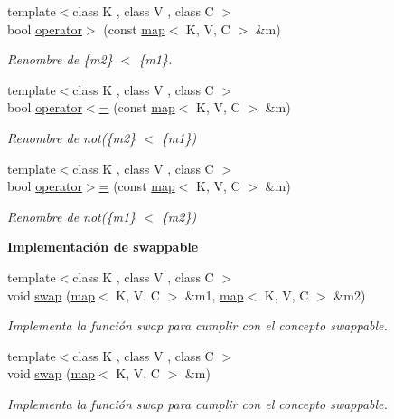 \begin{Indent}
\begin{DoxyCompactItemize}
{\footnotesize template$<$class K , class V , class C $>$ }\\bool \hyperlink{classaed2_1_1map_a964e8d831c17d77f457eb87a2f22d0d0}{operator$>$} (const \hyperlink{classaed2_1_1map}{map}$<$ K, V, C $>$ \&m)
\begin{DoxyCompactList}\small\item\em Renombre de \{m2\} $<$ \{m1\}. \end{DoxyCompactList}\item 
{\footnotesize template$<$class K , class V , class C $>$ }\\bool \hyperlink{classaed2_1_1map_a42f66578aa7e80b91eded54ac6b745cf}{operator$<$=} (const \hyperlink{classaed2_1_1map}{map}$<$ K, V, C $>$ \&m)
\begin{DoxyCompactList}\small\item\em Renombre de not(\{m2\} $<$ \{m1\}) \end{DoxyCompactList}\item 
{\footnotesize template$<$class K , class V , class C $>$ }\\bool \hyperlink{classaed2_1_1map_a68bf5a52b77446e43584fb67d22c365e}{operator$>$=} (const \hyperlink{classaed2_1_1map}{map}$<$ K, V, C $>$ \&m)
\begin{DoxyCompactList}\small\item\em Renombre de not(\{m1\} $<$ \{m2\}) \end{DoxyCompactList}\end{DoxyCompactItemize}
\end{Indent}
\begin{Indent}\textbf{ Implementación de swappable}\par
\begin{DoxyCompactItemize}
\item 
{\footnotesize template$<$class K , class V , class C $>$ }\\void \hyperlink{classaed2_1_1map_a119cb2938bbc11c25ebd4fb824782a72}{swap} (\hyperlink{classaed2_1_1map}{map}$<$ K, V, C $>$ \&m1, \hyperlink{classaed2_1_1map}{map}$<$ K, V, C $>$ \&m2)
\begin{DoxyCompactList}\small\item\em Implementa la función swap para cumplir con el concepto swappable. \end{DoxyCompactList}\item 
{\footnotesize template$<$class K , class V , class C $>$ }\\void \hyperlink{classaed2_1_1map_ae9604c72935a908c0c98a9f40bc38eda}{swap} (\hyperlink{classaed2_1_1map}{map}$<$ K, V, C $>$ \&m)
\begin{DoxyCompactList}\small\item\em Implementa la función swap para cumplir con el concepto swappable. \end{DoxyCompactList}\end{DoxyCompactItemize}
\end{Indent}


